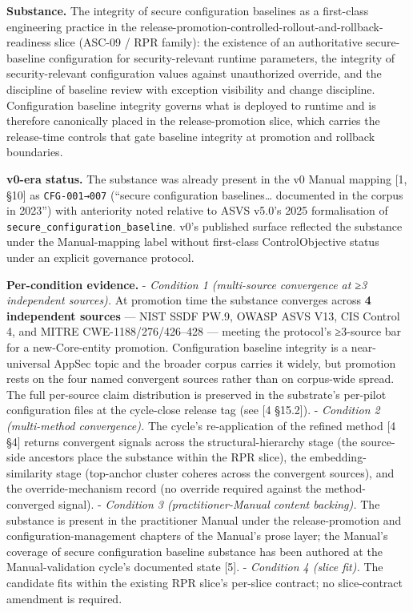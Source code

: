 \documentclass[
]{article}
\begin{document}
\textbf{Substance.} The integrity of secure configuration baselines as a
first-class engineering practice in the
release-promotion-controlled-rollout-and-rollback-readiness slice
(ASC-09 / RPR family): the existence of an authoritative secure-baseline
configuration for security-relevant runtime parameters, the integrity of
security-relevant configuration values against unauthorized override,
and the discipline of baseline review with exception visibility and
change discipline. Configuration baseline integrity governs what is
deployed to runtime and is therefore canonically placed in the
release-promotion slice, which carries the release-time controls that
gate baseline integrity at promotion and rollback boundaries.

\textbf{v0-era status.} The substance was already present in the v0
Manual mapping {[}1, §10{]} as \texttt{CFG-001→007} (``secure
configuration baselines\ldots{} documented in the corpus in 2023'') with
anteriority noted relative to ASVS v5.0's 2025 formalisation of
\texttt{secure\_configuration\_baseline}. v0's published surface
reflected the substance under the Manual-mapping label without
first-class ControlObjective status under an explicit governance
protocol.

\textbf{Per-condition evidence.} - \emph{Condition 1 (multi-source
convergence at ≥3 independent sources).} At promotion time the substance
converges across \textbf{4 independent sources} --- NIST SSDF PW.9,
OWASP ASVS V13, CIS Control 4, and MITRE CWE-1188/276/426--428 ---
meeting the protocol's ≥3-source bar for a new-Core-entity promotion.
Configuration baseline integrity is a near-universal AppSec topic and
the broader corpus carries it widely, but promotion rests on the four
named convergent sources rather than on corpus-wide spread. The full
per-source claim distribution is preserved in the substrate's per-pilot
configuration files at the cycle-close release tag (see {[}4 §15.2{]}).
- \emph{Condition 2 (multi-method convergence).} The cycle's
re-application of the refined method {[}4 §4{]} returns convergent
signals across the structural-hierarchy stage (the source-side ancestors
place the substance within the RPR slice), the embedding-similarity
stage (top-anchor cluster coheres across the convergent sources), and
the override-mechanism record (no override required against the
method-converged signal). - \emph{Condition 3 (practitioner-Manual
content backing).} The substance is present in the practitioner Manual
under the release-promotion and configuration-management chapters of the
Manual's prose layer; the Manual's coverage of secure configuration
baseline substance has been authored at the Manual-validation cycle's
documented state {[}5{]}. - \emph{Condition 4 (slice fit).} The
candidate fits within the existing RPR slice's per-slice contract; no
slice-contract amendment is required.
\end{document}
